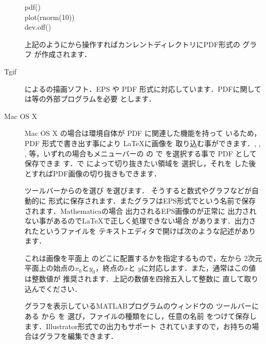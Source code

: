 \begin{description}
\begin{InText}
pdf()\\
plot(rnorm(10))\\
dev.off()
\end{InText}  

  上記のようにから操作すればカンレントディレクトリにPDF形式の
  グラフ が作成されます．
\item[Tgif] によるの描画ソフト．EPS
  や PDF 形式に対応しています．PDFに関しては\GS 等の外部プログラムを必要
  とします．
 \item[Mac OS X] Mac OS X の場合は環境自体が PDF に関連した機能を持って
 いるため，PDF 形式で書き出す事により \LaTeX に画像を
 取り込む事ができます．, , ,
 等，いずれの場合もメニューバーの  の
  で  を選択する事で PDF として保存できま
 す．で  によって切り抜きたい領域を
 選択し，それを  した後  とすればPDF画像の切り抜きもできます．

%
\item[\Prog{Mathematica}]
  ツールバーからのを選び
  を選びます． そうすると数式やグラフなどが自動的に
  {\LaTeXe}形式に保存されます．またグラフはEPS形式で{}という名前で保存されます．{Mathematica}の場合
  出力されるEPS画像のが正常に
  出力されない事があるので{\LaTeX}で正しく処理できない場合
  があります．出力されたというファイルを
  テキストエディタで開けば次のような記述があります．

\begin{InText}
\end{InText}

  これは画像を平面上
  のどこに配置するかを指定するもので，左から
  2次元平面上の始点の$x_0$と$y_0$，終点の$x$と
  $y$に対応します．また，通常はこの値は整数値が
  推奨されます．上記の数値を四捨五入して整数に
  直して取り込んでください．
\item[\Prog{MATLAB}]
  グラフを表示しているMATLABプログラムのウィンドウの
  ツールバーにある  から  を
  選び，ファイルの種類をにし，任意の名前
  をつけて保存します．{Illustrator}形式での出力もサポート
  されていますので，お持ちの場合はグラフを編集できます．
\end{description}

